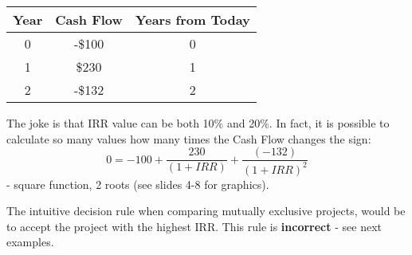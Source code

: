 \documentclass{scrartcl}
\begin{document}
\begin{tabular}{c|c|c}
  Year & Cash Flow & Years from Today \\
  \hline
  0 & -\$100 & 0  \\
  1 & \$230 & 1 \\
  2 & -\$132 & 2 \\
\end{tabular}

The joke is that IRR value can be both 10\% and 20\%. In fact, it is possible to
calculate so many values how many times the Cash Flow changes the sign:$$0=-100
+ \frac{230}{(1+IRR)} + \frac{(-132)}{(1+IRR)^2}$$ - square function, 2 roots
(see slides 4-8 for graphics).

The intuitive decision rule when comparing mutually exclusive projects, would be
to accept the project with the highest IRR. This rule is {\bf incorrect} - see
next examples.
\end{document}
